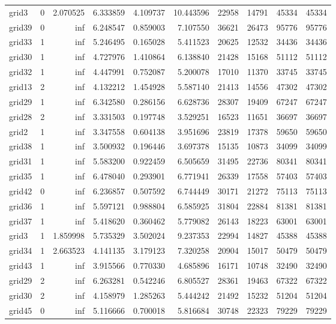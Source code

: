 \begin{longtable}{|l|r|r|r|r|r|r|r|r|r|}
grid3 & 0 & 2.070525 & 6.333859 & 4.109737 & 10.443596 & 22958 & 14791 & 45334 & 45334 \\
grid39 & 0 & inf & 6.248547 & 0.859003 & 7.107550 & 36621 & 26473 & 95776 & 95776 \\
grid33 & 1 & inf & 5.246495 & 0.165028 & 5.411523 & 20625 & 12532 & 34436 & 34436 \\
grid30 & 1 & inf & 4.727976 & 1.410864 & 6.138840 & 21428 & 15168 & 51112 & 51112 \\
grid32 & 1 & inf & 4.447991 & 0.752087 & 5.200078 & 17010 & 11370 & 33745 & 33745 \\
grid13 & 2 & inf & 4.132212 & 1.454928 & 5.587140 & 21413 & 14556 & 47302 & 47302 \\
grid29 & 1 & inf & 6.342580 & 0.286156 & 6.628736 & 28307 & 19409 & 67247 & 67247 \\
grid28 & 2 & inf & 3.331503 & 0.197748 & 3.529251 & 16523 & 11651 & 36697 & 36697 \\
grid2 & 1 & inf & 3.347558 & 0.604138 & 3.951696 & 23819 & 17378 & 59650 & 59650 \\
grid38 & 1 & inf & 3.500932 & 0.196446 & 3.697378 & 15135 & 10873 & 34099 & 34099 \\
grid31 & 1 & inf & 5.583200 & 0.922459 & 6.505659 & 31495 & 22736 & 80341 & 80341 \\
grid35 & 1 & inf & 6.478040 & 0.293901 & 6.771941 & 26339 & 17558 & 57403 & 57403 \\
grid42 & 0 & inf & 6.236857 & 0.507592 & 6.744449 & 30171 & 21272 & 75113 & 75113 \\
grid36 & 1 & inf & 5.597121 & 0.988804 & 6.585925 & 31804 & 22884 & 81381 & 81381 \\
grid37 & 1 & inf & 5.418620 & 0.360462 & 5.779082 & 26143 & 18223 & 63001 & 63001 \\
grid3 & 1 & 1.859998 & 5.735329 & 3.502024 & 9.237353 & 22994 & 14827 & 45388 & 45388 \\
grid34 & 1 & 2.663523 & 4.141135 & 3.179123 & 7.320258 & 20904 & 15017 & 50479 & 50479 \\
grid43 & 1 & inf & 3.915566 & 0.770330 & 4.685896 & 16171 & 10748 & 32490 & 32490 \\
grid29 & 2 & inf & 6.263281 & 0.542246 & 6.805527 & 28361 & 19463 & 67322 & 67322 \\
grid30 & 2 & inf & 4.158979 & 1.285263 & 5.444242 & 21492 & 15232 & 51204 & 51204 \\
grid45 & 0 & inf & 5.116666 & 0.700018 & 5.816684 & 30748 & 22323 & 79229 & 79229 \\

\end{longtable}
